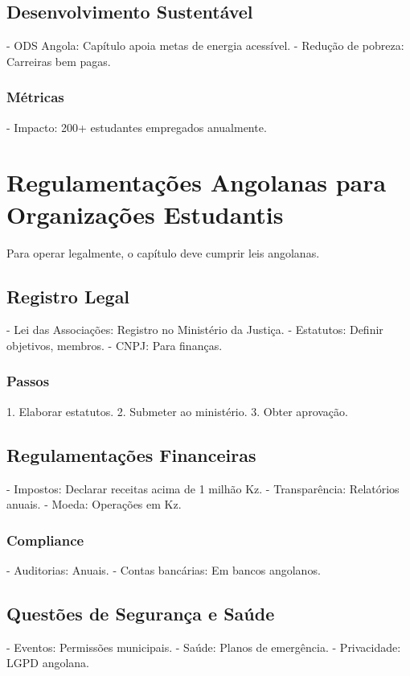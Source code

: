 \documentclass[12pt]{article}
\begin{document}
\subsection{Desenvolvimento Sustentável}
- ODS Angola: Capítulo apoia metas de energia acessível.
- Redução de pobreza: Carreiras bem pagas.

\subsubsection{Métricas}
- Impacto: 200+ estudantes empregados anualmente.

\section{Regulamentações Angolanas para Organizações Estudantis}

Para operar legalmente, o capítulo deve cumprir leis angolanas.

\subsection{Registro Legal}
- Lei das Associações: Registro no Ministério da Justiça.
- Estatutos: Definir objetivos, membros.
- CNPJ: Para finanças.

\subsubsection{Passos}
1. Elaborar estatutos.
2. Submeter ao ministério.
3. Obter aprovação.

\subsection{Regulamentações Financeiras}
- Impostos: Declarar receitas acima de 1 milhão Kz.
- Transparência: Relatórios anuais.
- Moeda: Operações em Kz.

\subsubsection{Compliance}
- Auditorias: Anuais.
- Contas bancárias: Em bancos angolanos.

\subsection{Questões de Segurança e Saúde}
- Eventos: Permissões municipais.
- Saúde: Planos de emergência.
- Privacidade: LGPD angolana.
\end{document}
